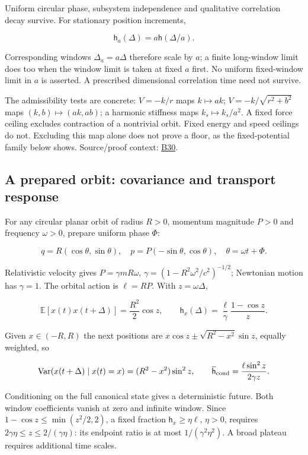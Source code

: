 \documentclass[11pt,a4paper]{article}
\begin{document}
Uniform circular phase, subsystem independence and qualitative
correlation decay survive. For stationary position increments,

\[\mathsf h_a(\Delta)=a\mathsf h(\Delta/a).\]

Corresponding windows \(\Delta_a=a\Delta\) therefore scale by \(a\); a
finite long-window limit does too when the window limit is taken at
fixed \(a\) first. No uniform fixed-window limit in \(a\) is asserted. A
prescribed dimensional correlation time need not survive.

The admissibility tests are concrete: \(V=-k/r\) maps \(k\mapsto ak\);
\(V=-k/\sqrt{r^2+b^2}\) maps \((k,b)\mapsto(ak,ab)\); a harmonic
stiffness maps \(k_s\mapsto k_s/a^2\). A fixed force ceiling excludes
contraction of a nontrivial orbit. Fixed energy and speed ceilings do
not. Excluding this map alone does not prove a floor, as the
fixed-potential family below shows. Source/proof context:
\href{../references/batches/B30.md}{B30}.

\hypertarget{a-prepared-orbit-covariance-and-transport-response}{%
\subsection{A prepared orbit: covariance and transport
response}\label{a-prepared-orbit-covariance-and-transport-response}}

For any circular planar orbit of radius \(R>0\), momentum magnitude
\(P>0\) and frequency \(\omega>0\), prepare uniform phase \(\Phi\):

\[q=R(\cos\theta,\sin\theta),\quad
p=P(-\sin\theta,\cos\theta),\quad \theta=\omega t+\Phi.\]

Relativistic velocity gives \(P=\gamma mR\omega\),
\(\gamma=(1-R^2\omega^2/c^2)^{-1/2}\); Newtonian motion has
\(\gamma=1\). The orbital action is \(\ell=RP\). With
\(z=\omega\Delta\),

\[\mathbb E[x(t)x(t+\Delta)]=\frac{R^2}2\cos z,\qquad
\mathsf h_x(\Delta)=\frac{\ell}{\gamma}\frac{1-\cos z}{z}.\]

Given \(x\in(-R,R)\) the next positions are
\(x\cos z\pm\sqrt{R^2-x^2}\sin z\), equally weighted, so

\[\operatorname{Var}(x(t+\Delta)\mid x(t)=x)=(R^2-x^2)\sin^2z,\qquad
\overline{\mathsf h}_{\rm cond}=\frac{\ell\sin^2z}{2\gamma z}.\]

Conditioning on the full canonical state gives a deterministic future.
Both window coefficients vanish at zero and infinite window. Since
\(1-\cos z\le\min(z^2/2,2)\), a fixed fraction
\(\mathsf h_x\ge\eta\ell\), \(\eta>0\), requires
\(2\gamma\eta\le z\le2/(\gamma\eta)\): its endpoint ratio is at most
\(1/(\gamma^2\eta^2)\). A broad plateau requires additional time scales.
\end{document}
